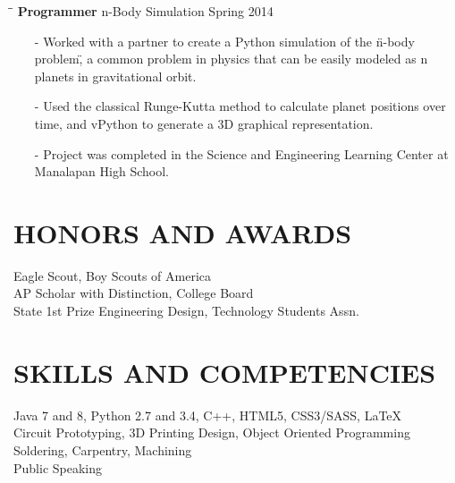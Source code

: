 \documentclass{res}
\begin{document}
\begin{resume}
\begin{tabbing}
    \hspace{2.3in}\= \hspace{2.4in}\= \kill
    {\bf Programmer} \>n-Body Simulation \>Spring 2014\\
  \end{tabbing}\vspace{-15pt}
  \begin{itemize}[leftmargin=*, nolistsep]
    \item[-] Worked with a partner to create a Python simulation of the \"n-body problem\", a common problem in physics that can be easily modeled as n planets in gravitational orbit.
    \item[-] Used the classical Runge-Kutta method to calculate planet positions over time, and vPython to generate a 3D graphical representation.
    \item[-] Project was completed in the Science and Engineering Learning Center at Manalapan High School.
  \end{itemize}
 
\section{HONORS AND AWARDS}
	Eagle Scout, Boy Scouts of America \\
	AP Scholar with Distinction, College Board \\
	State 1st Prize Engineering Design, Technology Students Assn.

\section{SKILLS AND COMPETENCIES}
  Java 7 and 8, Python 2.7 and 3.4, C++, HTML5, CSS3/SASS, \LaTeX \\
  Circuit Prototyping, 3D Printing Design, Object Oriented Programming \\
  Soldering, Carpentry, Machining \\
  Public Speaking
	
\end{resume}
\end{document}
